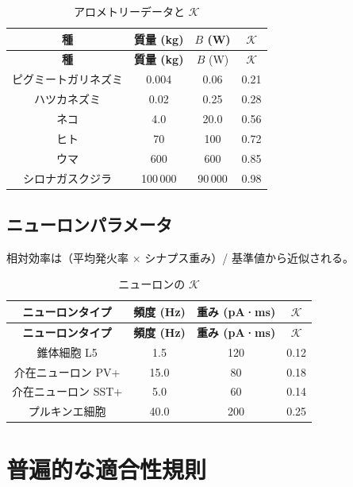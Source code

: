 \documentclass[12pt,a4paper]{ltjsarticle}
\newcommand{\REL}{\mathcal{K}}          %
\begin{document}
	\begin{longtable}{|c|c|c|c|}
		\caption{アロメトリーデータと \(\REL\)}\label{tab:allometry}\\
		\hline
		\textbf{種} & \textbf{質量 (kg)} & \(B\) (W) & \(\REL\) \\
		\hline
		\endfirsthead
		\hline
		\textbf{種} & \textbf{質量 (kg)} & \(B\) (W) & \(\REL\) \\
		\hline
		\endhead
		\hline
		ピグミートガリネズミ & 0.004 & 0.06 & 0.21 \\
		ハツカネズミ & 0.02 & 0.25 & 0.28 \\
		ネコ & 4.0 & 20.0 & 0.56 \\
		ヒト & 70 & 100 & 0.72 \\
		ウマ & 600 & 600 & 0.85 \\
		シロナガスクジラ & 100\,000 & 90\,000 & 0.98 \\
		\hline
	\end{longtable}
	
	\subsection{ニューロンパラメータ}
	\label{sec:neural}
	相対効率は（平均発火率 × シナプス重み）/ 基準値から近似される。
	
	\begin{longtable}{|c|c|c|c|}
		\caption{ニューロンの \(\REL\)}\label{tab:neural}\\
		\hline
		\textbf{ニューロンタイプ} & \textbf{頻度 (Hz)} & \textbf{重み (pA·ms)} & \(\REL\) \\
		\hline
		\endfirsthead
		\hline
		\textbf{ニューロンタイプ} & \textbf{頻度 (Hz)} & \textbf{重み (pA·ms)} & \(\REL\) \\
		\hline
		\endhead
		\hline
		錐体細胞 L5 & 1.5 & 120 & 0.12 \\
		介在ニューロン PV+ & 15.0 & 80 & 0.18 \\
		介在ニューロン SST+ & 5.0 & 60 & 0.14 \\
		プルキンエ細胞 & 40.0 & 200 & 0.25 \\
		\hline
	\end{longtable}
	
	\section{普遍的な適合性規則}
	\label{sec:compatibility}
	
\end{document}
